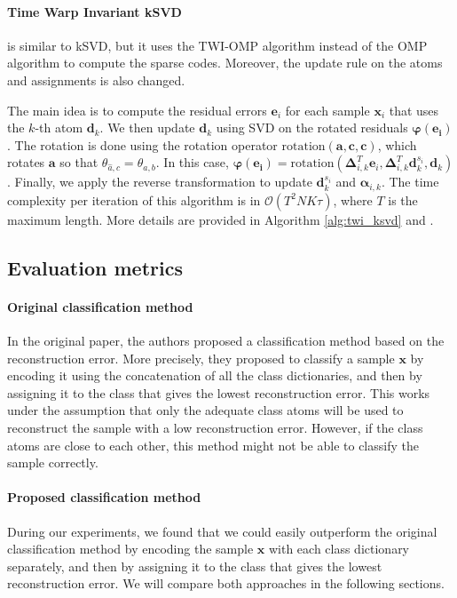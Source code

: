 \documentclass[11pt]{article}
\begin{document}
\paragraph{Time Warp Invariant kSVD} is similar to kSVD, but it uses the TWI-OMP algorithm instead of the OMP algorithm to compute the sparse codes. Moreover, the update rule on the atoms and assignments is also changed. 

The main idea is to compute the residual errors $\bm{e}_i$ for each sample $\bm{x}_i$ that uses the $k$-th atom $\bm{d}_k$. We then update $\bm{d}_k$ using SVD on the rotated residuals $\bm{\varphi(\bm{e}_i)}$. The rotation is done using the rotation operator $\text{rotation}(\bm{a}, \bm{c}, \bm{c})$, which rotates $\bm{a}$ so that $\theta_{\hat{a}, c} = \theta_{a, b}$. In this case, $\bm{\varphi(\bm{e}_i)} = \text{rotation}(\bm{\Delta}_{i, k}^T\bm{e}_i, \bm{\Delta}_{i, k}^T\bm{d}_k^{s_i}, \bm{d}_k)$. Finally, we apply the reverse transformation to update $\bm{d}_k^{s_i}$ and $\bm{\alpha}_{i, k}$. The time complexity per iteration of this algorithm is in $\mathcal{O}(T^2 N K \tau)$, where $T$ is the maximum length. More details are provided in Algorithm \ref{alg:twi_ksvd} and \cite{main_thesis}.

\subsection{Evaluation metrics}

\paragraph{Original classification method} In the original paper, the authors proposed a classification method based on the reconstruction error. More precisely, they proposed to classify a sample $\bm{x}$ by encoding it using the concatenation of all the class dictionaries, and then by assigning it to the class that gives the lowest reconstruction error. This works under the assumption that only the adequate class atoms will be used to reconstruct the sample with a low reconstruction error. However, if the class atoms are close to each other, this method might not be able to classify the sample correctly.

\paragraph{Proposed classification method} During our experiments, we found that we could easily outperform the original classification method by encoding the sample $\bm{x}$ with each class dictionary separately, and then by assigning it to the class that gives the lowest reconstruction error. We will compare both approaches in the following sections.
\end{document}
